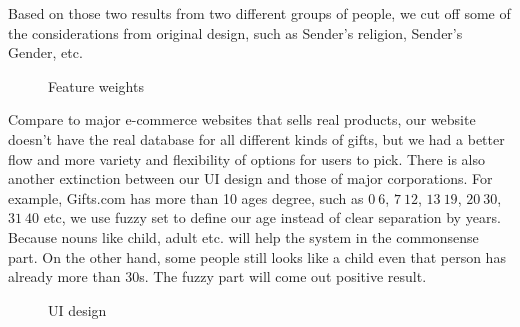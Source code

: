 \documentclass[11pt,twocolumn]{article}
\begin{document}
Based on those two results from two different groups of people, we cut off some of the considerations from original design, such as Sender's religion, Sender's Gender, etc.


\begin{figure}[h!t]
\caption{Feature weights}
\label{feature}
\end{figure}


Compare to major e-commerce websites that sells real products, our website doesn't have the real database for all different kinds of gifts, but we had a better flow and more variety and flexibility of options for users to pick. There is also another extinction between our UI design and those of major corporations. For example, Gifts.com has more than 10 ages degree, such as $0~6$, $7~12$, $13~19$, $20~30$, $31~40$ etc, we use fuzzy set to define our age instead of clear separation by years. Because nouns like child, adult etc. will help the system in the commonsense part.  On the other hand, some people still looks like a child even that person has already more than 30s.  The fuzzy part will come out positive result.

\begin{figure}[h!t]
\caption{UI design}
\label{ui}
\end{figure}
\end{document}

